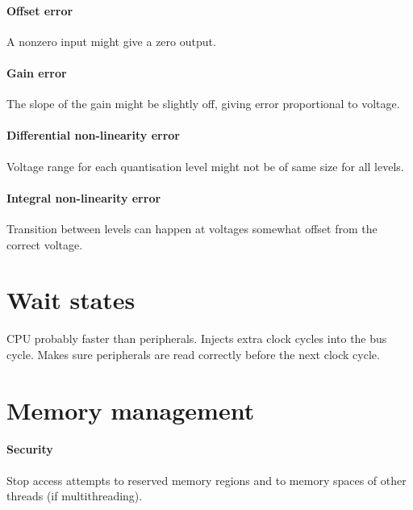 \documentclass[a4paper, 12pt]{article}
\begin{document}
\paragraph{Offset error} A nonzero input might give a zero output.
\paragraph{Gain error} The slope of the gain might be slightly off, giving error proportional to voltage.
\paragraph{Differential non-linearity error} Voltage range for each quantisation level might not be of same size for all levels.
\paragraph{Integral non-linearity error} Transition between levels can happen at voltages somewhat offset from the correct voltage.



\section{Wait states}
CPU probably faster than peripherals. Injects extra clock cycles into the bus cycle. Makes sure peripherals are read correctly before the next clock cycle.



\section{Memory management}

\paragraph{Security} Stop access attempts to reserved memory regions and to memory spaces of other threads (if multithreading).
\end{document}
